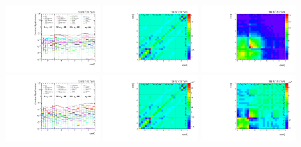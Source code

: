 \begin{figure}[htb]
\begin{center}
 \includegraphics[width=0.32\textwidth]{fig_fullRun2UL/unfolding/combined/deltaSystCombinedlog_rebinnedB_b1k_mttbar.pdf}
 \includegraphics[width=0.32\textwidth]{fig_fullRun2UL/unfolding/combined/StatCovMatrix_rebinnedB_b1k_mttbar.pdf}
 \includegraphics[width=0.32\textwidth]{fig_fullRun2UL/unfolding/combined/TotalSystCovMatrix_rebinnedB_b1k_mttbar.pdf} \\
 \includegraphics[width=0.32\textwidth]{fig_fullRun2UL/unfolding/combined/deltaSystCombinedlogNorm_rebinnedB_b1k_mttbar.pdf}
 \includegraphics[width=0.32\textwidth]{fig_fullRun2UL/unfolding/combined/StatCovMatrixNorm_rebinnedB_b1k_mttbar.pdf}
 \includegraphics[width=0.32\textwidth]{fig_fullRun2UL/unfolding/combined/TotalSystCovMatrixNorm_rebinnedB_b1k_mttbar.pdf} \\

\end{center}
\end{figure}
